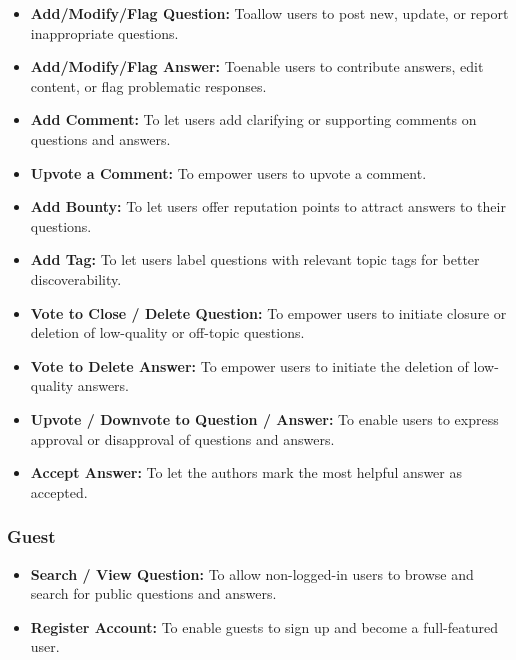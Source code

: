 \begin{itemize}
\item
\textbf{Add/Modify/Flag Question:} Toallow users to post new, update, or report inappropriate questions.
\item
\protect{}\label{dCiMA08R_jQRNPEjKs0KX}
\textbf{Add/Modify/Flag Answer:} Toenable users to contribute answers, edit content, or flag problematic responses.
\item
\protect{}\label{IA7xR9tycCBMO8CHOgAJL}
\textbf{Add Comment:} To let users add clarifying or supporting comments on questions and answers.
\item
\protect{}\label{A2OFxLl34jUloElEhhmCI}
\textbf{Upvote a Comment:} To empower users to upvote a comment.
\item
\protect{}\label{f2v4lp3_BXpBJCeobqGb6}
\textbf{Add Bounty:} To let users offer reputation points to attract answers to their questions.
\item
\protect{}\label{bL6dW7F6HTQDCFxSpemy9}
\textbf{Add Tag:} To let users label questions with relevant topic tags for better discoverability.
\item
\protect{}\label{BFVUkToCOSK7xCJchBhNQ}
\textbf{Vote to Close / Delete Question:} To empower users to initiate closure or deletion of low-quality or off-topic questions.
\item
\protect{}\label{Wp_j3PTfG5Qqkfp8-U2TR}
\textbf{Vote to Delete Answer:} To empower users to initiate the deletion of low-quality answers.
\item
\protect{}\label{7abTA_lHwQQr18s9PUqDL}
\textbf{Upvote / Downvote to Question / Answer:} To enable users to express approval or disapproval of questions and answers.
\item
\protect{}\label{Dn5LL8C-0dhFxwm918ndY}
\textbf{Accept Answer:} To let the authors mark the most helpful answer as accepted.
\end{itemize}

\subsubsection{Guest}\label{UmThuzJ318y8Gg0HlkKZA}

\begin{itemize}
\item
\protect{}\label{6TteFajqIJ7PkaUv-csSd}
\textbf{Search / View Question:} To allow non-logged-in users to browse and search for public questions and answers.
\item
\protect{}\label{mZ5zmcHjl5dRYITFp8yQ-}
\textbf{Register Account:} To enable guests to sign up and become a full-featured user.
\end{itemize}


